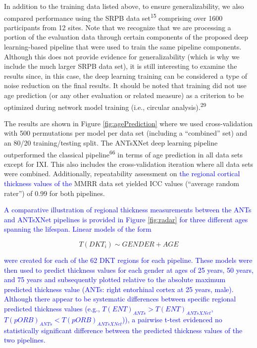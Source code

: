 \documentclass[
  12pt,
]{article}
\begin{document}
In addition to the training data listed above, to ensure
generalizability, we also compared performance using the SRPB data
set\textsuperscript{15} comprising over 1600 participants from 12 sites.
Note that we recognize that we are processing a portion of the
evaluation data through certain components of the proposed deep
learning-based pipeline that were used to train the same pipeline
components. Although this does not provide evidence for generalizability
(which is why we include the much larger SRPB data set), it is still
interesting to examine the results since, in this case, the deep
learning training can be considered a type of noise reduction on the
final results. It should be noted that training did not use age
prediction (or any other evaluation or related measure) as a criterion
to be optimized during network model training (i.e., circular
analysis).\textsuperscript{29}

The results are shown in Figure \ref{fig:agePrediction} where we used
cross-validation with 500 permutations per model per data set (including
a ``combined'' set) and an 80/20 training/testing split. The ANTsXNet
deep learning pipeline outperformed the classical
pipeline\textsuperscript{66} in terms of age prediction in all data sets
except for IXI. This also includes the cross-validation iteration where
all data sets were combined. Additionally, repeatability assessment on
\textcolor{blue}{the regional cortical thickness
values of the} MMRR data set yielded ICC values (``average random
rater'') of 0.99 for both pipelines.

\textcolor{blue}{
A comparative illustration of regional thickness measurements between the ANTs
and ANTsXNet pipelines is provided in Figure \ref{fig:radar} for three different
ages spanning the lifespan.  Linear models of the form}

\begin{equation}
  T(DKT_i) \sim GENDER + AGE
\end{equation}

\textcolor{blue}{
were created for each of the 62 DKT regions for each pipeline.  These models were
then used to predict thickness values for each gender at ages of 25 years, 50 years,
and 75 years and subsequently plotted relative to the absolute maximum predicted
thickness value (ANTs:  right entorhinal cortex at 25 years, male).  Although
there appear to be systematic differences between specific regional predicted
thickness values (e.g., $T(ENT)_{ANTs} > T(ENT)_{ANTsXNet}$,
$T(pORB)_{ANTs} < T(pORB)_{ANTsXNet}$)), a pairwise t-test evidenced no statistically
significant difference between the predicted thickness values of the two pipelines.}
\end{document}
